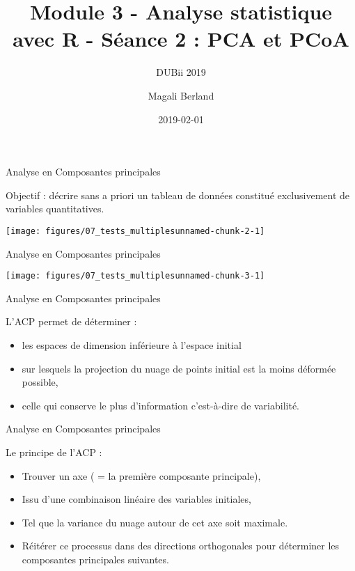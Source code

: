 \documentclass[ignorenonframetext,]{beamer}
\title{Module 3 - Analyse statistique avec R - Séance 2 : PCA et PCoA}
\subtitle{DUBii 2019}
\author{Magali Berland}
\date{2019-02-01}
\providecommand{\tightlist}{%
  \setlength{\itemsep}{0pt}\setlength{\parskip}{0pt}}
\begin{document}
\frame{\titlepage}

\begin{frame}
\tableofcontents[hideallsubsections]
\end{frame}

\begin{frame}{Analyse en Composantes principales}

Objectif : décrire sans a priori un tableau de données constitué
exclusivement de variables quantitatives.

\begin{center}\texttt{[image: figures/07\_tests\_multiplesunnamed-chunk-2-1]} \end{center}

\end{frame}

\begin{frame}{Analyse en Composantes principales}

\begin{center}\texttt{[image: figures/07\_tests\_multiplesunnamed-chunk-3-1]} \end{center}

\end{frame}

\begin{frame}{Analyse en Composantes principales}

L'ACP permet de déterminer :

\begin{itemize}
\tightlist
\item
  les espaces de dimension inférieure à l'espace initial
\item
  sur lesquels la projection du nuage de points initial est la moins
  déformée possible,
\item
  celle qui conserve le plus d'information c'est-à-dire de variabilité.
\end{itemize}

\end{frame}

\begin{frame}{Analyse en Composantes principales}

Le principe de l'ACP :

\begin{itemize}
\tightlist
\item
  Trouver un axe ( = la première composante principale),
\item
  Issu d'une combinaison linéaire des variables initiales,
\item
  Tel que la variance du nuage autour de cet axe soit maximale.
\item
  Réitérer ce processus dans des directions orthogonales pour déterminer
  les composantes principales suivantes.
\end{itemize}

\end{frame}
\end{document}

